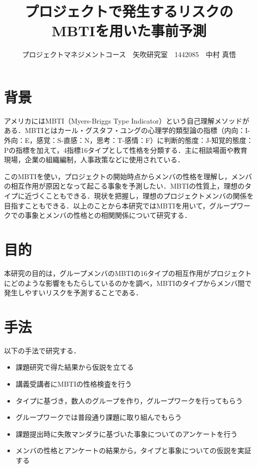 \documentclass[uplatex,twocolumn,dvipdfmx]{jsarticle}
\title{\vspace{-5mm}\fontsize{14pt}{0pt}\selectfont プロジェクトで発生するリスクのMBTIを用いた事前予測}
\author{\normalsize プロジェクトマネジメントコース　矢吹研究室　1442085　中村 真悟}
\date{}
\begin{document}
\fontsize{10.5pt}{\baselineskip}\selectfont
\maketitle






\section{背景}
アメリカにはMBTI（Myers-Briggs Type Indicator）という自己理解メソッドがある．MBTIとはカール・グスタフ・ユングの心理学的類型論の指標（内向：I-外向：E，感覚：S-直感：N，思考：T-感情：F）に判断的態度：J-知覚的態度：Pの指標を加えて，4指標16タイプとして性格を分類する．主に相談場面や教育現場，企業の組織編制，人事政策などに使用されている\cite{110001230195}．

このMBTIを使い，プロジェクトの開始時点からメンバの性格を理解し，メンバの相互作用が原因となって起こる事象を予測したい．MBTIの性質上，理想のタイプに近づくこともできる．現状を把握し，理想のプロジェクトメンバの関係を目指すこともできる．以上のことから本研究ではMBTIを用いて，グループワークでの事象とメンバの性格との相関関係について研究する．

\section{目的}
本研究の目的は，グループメンバのMBTIの16タイプの相互作用がプロジェクトにどのような影響をもたらしているのかを調べ，MBTIのタイプからメンバ間で発生しやすいリスクを予測することである．

\section{手法}
以下の手法で研究する．
\begin{itemize}
\item 課題研究で得た結果から仮説を立てる
\item 講義受講者にMBTIの性格検査\cite{mbti}を行う
\item タイプに基づき，数人のグループを作り，グループワークを行ってもらう
\item グループワークでは普段通り課題に取り組んでもらう
\item 課題提出時に失敗マンダラ\cite{110009915588}に基づいた事象についてのアンケートを行う
\item メンバの性格とアンケートの結果から，タイプと事象についての仮説を実証する
\end{itemize}
\end{document}
